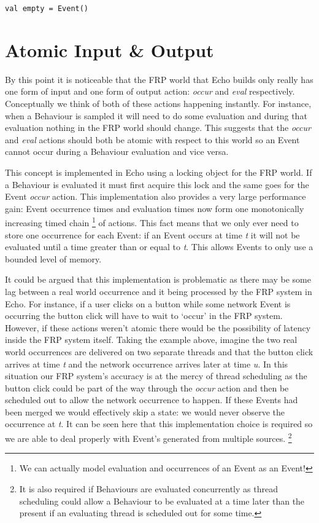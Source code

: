 \begin{verbatim}
val empty = Event()
\end{verbatim}
  
  \section{Atomic Input \& Output}
    
     By this point it is noticeable that the FRP world that Echo builds only really has one form of input and one
     form of output action: \emph{occur} and \emph{eval} respectively. Conceptually we think of both of these
     actions happening instantly. For instance, when a Behaviour is sampled it will need to do some evaluation
     and during that evaluation nothing in the FRP world should change. This suggests that the \emph{occur}
     and \emph{eval} actions should both be atomic with respect to this world so an Event cannot occur during
     a Behaviour evaluation and vice versa. 
   
     This concept is implemented in Echo using a locking object for the FRP world. If a Behaviour is evaluated it
     must first acquire this lock and the same goes for the Event \emph{occur} action. This implementation
     also provides a very large performance gain: Event occurrence times and evaluation times now form one
     monotonically increasing timed chain \footnote{We can actually model evaluation and occurrences of an Event as an 
     Event!} of actions. This fact means that we only ever need to store one occurrence for each Event: if an Event occurs
     at time \emph{t} it will not be evaluated until a time greater than or equal to \emph{t}. This allows
     Events to only use a bounded level of memory.
   
     It could be argued that this implementation is problematic as there may be some lag between a real world
     occurrence and it being processed by the FRP system in Echo. For instance, if a user clicks on a button
     while some network Event is occurring the button click will have to wait to `occur' in the FRP system.
     However, if these actions weren't atomic there would be the possibility of latency inside the FRP
     system itself. Taking the example above, imagine the two real world occurrences are delivered on two
     separate threads and that the button click arrives at time \emph{t} and the network occurrence
     arrives later at time \emph{u}. In this
     situation our FRP system's accuracy is at the mercy of thread scheduling as the button click
     could be part of the way through the \emph{occur} action and then be scheduled out to allow the network
     occurrence to happen. If these Events had been merged we would effectively skip a state:
     we would never observe the occurrence at \emph{t}. It can be seen here that this implementation
     choice is required so we are able to deal properly with Event's generated from multiple sources. 
     \footnote{It is also required if Behaviours are evaluated concurrently as thread scheduling could
     allow a Behaviour to be evaluated at a time later than the present if an evaluating thread is
     scheduled out for some time.}
     
